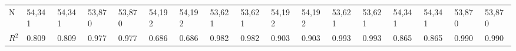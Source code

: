 \begin{tabular}{lllllllllllllllll}
N                            &                              54,341 &                              54,341 &                             53,870 &                             53,870 &                              54,192 &                              54,192 &                              53,621 &                              53,621 &                              54,192 &                              54,192 &                              53,621 &                              53,621 &                              54,341 &                              54,341 &                             53,870 &                             53,870 \\
$R^2$                        &                               0.809 &                               0.809 &                              0.977 &                              0.977 &                               0.686 &                               0.686 &                               0.982 &                               0.982 &                               0.903 &                               0.903 &                               0.993 &                               0.993 &                               0.865 &                               0.865 &                              0.990 &                              0.990 \\
\bottomrule
\end{tabular}
